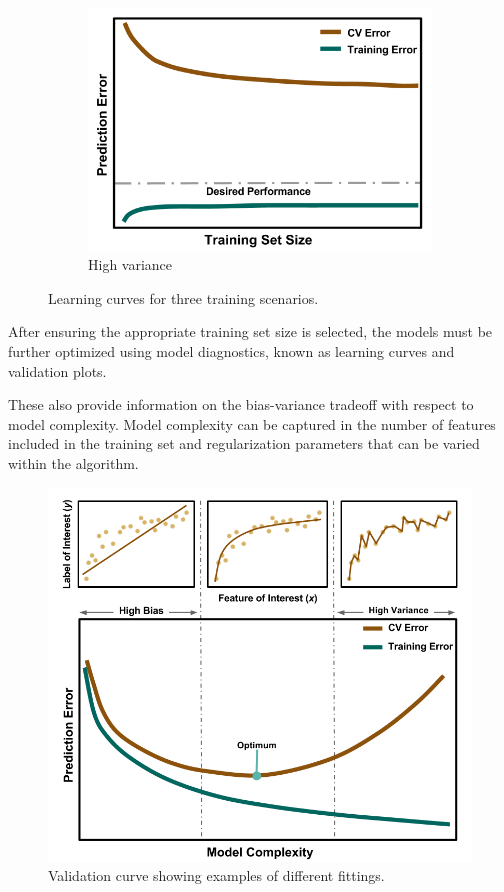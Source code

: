 \begin{figure}[!hp]
\begin{subfigure}[h]{0.65\linewidth}
    \includegraphics[width=\linewidth]{./chapters/litrev/LearningCurve-variance.png}
    \caption{High variance}
    \label{fig:variance}
  \end{subfigure}
  \caption{Learning curves for three training scenarios.}
  \label{fig:learning}
\end{figure}

After ensuring the appropriate training set size is selected, the models must
be further optimized using model diagnostics, known as learning curves and validation plots.

These also provide information on the bias-variance tradeoff with respect to
model complexity. Model complexity can be captured in the number of features
included in the training set and regularization parameters that can be varied
within the algorithm. 

\begin{figure}[!htb]
  \centering
  \includegraphics[width=1.05\linewidth]{./chapters/litrev/ValidationCurve.png}
  \caption{Validation curve showing examples of different fittings.}
  \label{fig:validation}
\end{figure}


